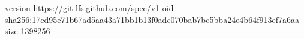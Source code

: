 version https://git-lfs.github.com/spec/v1
oid sha256:17cd95e71b67ad5aa43a71bb1b13f0adc070bab7bc5bba24e4b64f913ef7a6aa
size 1398256
